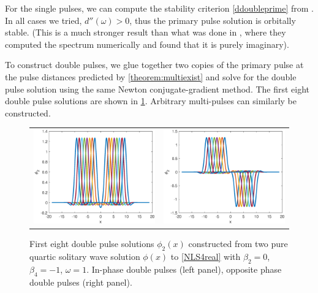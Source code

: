 \documentclass[12pt]{article}
\begin{document}
For the single pulses, we can compute the stability criterion \cref{ddoubleprime} from \cite{Grillakis1987}. In all cases we tried, $d''(\omega) > 0$, thus the primary pulse solution is orbitally stable. (This is a much stronger result than what was done in \cite{Tam2020}, where they computed the spectrum numerically and found that it is purely imaginary). 

To construct double pulses, we glue together two copies of the primary pulse at the pulse distances predicted by \cref{theorem:multiexist} and solve for the double pulse solution using the same Newton conjugate-gradient method. The first eight double pulse solutions are shown in \cref{fig:doublepulses}. Arbitrary multi-pulses can similarly be constructed.

\begin{figure}[H]
\centering
\begin{tabular}{cc}
\includegraphics[width=8cm]{images/DPplus.eps} &
\includegraphics[width=8cm]{images/DPminus.eps}
\end{tabular}
\caption{First eight double pulse solutions $\phi_2(x)$ constructed from two pure quartic solitary wave solution $\phi(x)$ to \cref{NLS4real} with $\beta_2 = 0$, $\beta_4 = -1$, $\omega = 1$. In-phase double pulses (left panel), opposite phase double pulses (right panel). }
\label{fig:doublepulses}
\end{figure} 
\end{document}
